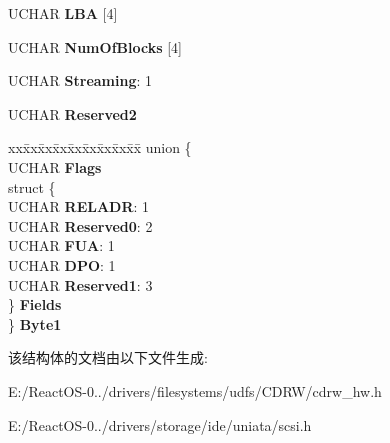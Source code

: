 \begin{DoxyCompactItemize}
\begin{tabbing}
\end{tabbing}\item 
\mbox{\label{struct___c_d_b_1_1___c_d_b12_r_e_a_d_w_r_i_t_e_ad46c647abd6a060832d21005778bed95}} 
U\+C\+H\+AR {\bfseries L\+BA} \mbox{[}4\mbox{]}
\item 
\mbox{\label{struct___c_d_b_1_1___c_d_b12_r_e_a_d_w_r_i_t_e_af0e46921997de5f1092a6f33f5d6cde2}} 
U\+C\+H\+AR {\bfseries Num\+Of\+Blocks} \mbox{[}4\mbox{]}
\item 
\mbox{\label{struct___c_d_b_1_1___c_d_b12_r_e_a_d_w_r_i_t_e_a0cf2cc549e2c8e62523028f04326002b}} 
U\+C\+H\+AR {\bfseries Streaming}\+: 1
\item 
\mbox{\label{struct___c_d_b_1_1___c_d_b12_r_e_a_d_w_r_i_t_e_adc19a0e1cadc7619466edc3554595b9e}} 
U\+C\+H\+AR {\bfseries Reserved2}
\item 
\mbox{\label{struct___c_d_b_1_1___c_d_b12_r_e_a_d_w_r_i_t_e_a8f129bcc9ec008349ae8ecf82180729c}} 
\begin{tabbing}
xx\=xx\=xx\=xx\=xx\=xx\=xx\=xx\=xx\=\kill
union \{\\
\>UCHAR {\bfseries Flags}\\
\>struct \{\\
\>\>UCHAR {\bfseries RELADR}: 1\\
\>\>UCHAR {\bfseries Reserved0}: 2\\
\>\>UCHAR {\bfseries FUA}: 1\\
\>\>UCHAR {\bfseries DPO}: 1\\
\>\>UCHAR {\bfseries Reserved1}: 3\\
\>\} {\bfseries Fields}\\
\} {\bfseries Byte1}\\

\end{tabbing}\end{DoxyCompactItemize}


该结构体的文档由以下文件生成\+:\begin{DoxyCompactItemize}
\item 
E\+:/\+React\+O\+S-\/0../drivers/filesystems/udfs/\+C\+D\+R\+W/cdrw\+\_\+hw.\+h\item 
E\+:/\+React\+O\+S-\/0../drivers/storage/ide/uniata/scsi.\+h\end{DoxyCompactItemize}

